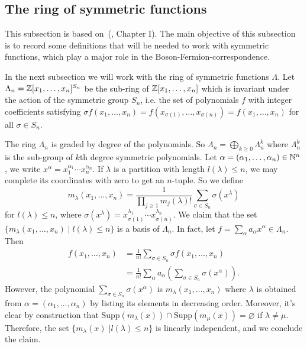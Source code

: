\subsection{The ring of symmetric functions}
This subsection is based on~(\cite{macdonald1998symmetric}, Chapter I). The main objective of this subsection is to record some definitions that will be needed to work with symmetric functions, which play a major role in the Boson-Fermion-correspondence.\par
In the next subsection we will work with the ring of symmetric functions $\Lambda$.
Let $\Lambda_n=\mathbb{Z}[x_1,\dots, x_n]^{S_n}$ be the sub-ring of $\mathbb{Z}[x_1,\dots,x_n]$ which is invariant under the action of the symmetric group $S_n$, i.e. the set of polynomials $f$ with integer coefficients satisfying $\sigma f(x_1,\dots,x_n)=f(x_{\sigma(1)},\dots, x_{\sigma(n)})=f(x_1,\dots,x_n)$ for all $\sigma\in S_n$. \par
The ring $\Lambda_n$ is graded by degree of the polynomials. So $\Lambda_n=\bigoplus_{k\geq0}\Lambda_n^k$ 
where $\Lambda_n^k$ is the sub-group of $k$th degree symmetric polynomials. 
Let $\alpha=(\alpha_1,\dots,\alpha_n)\in\mathbb{N}^n$, 
we write $x^\alpha=x_1^{\alpha_1}\cdots x_n^{\alpha_n}$. If $\lambda$ is a partition with length $l(\lambda)\leq n$, 
we may complete its coordinates with zero to get an $n$-tuple. So we define
\begin{equation}
    m_\lambda(x_1,\dots,x_n)=\frac{1}{\prod_{j\geq1} m_j(\lambda)!}\sum_{\sigma\in S_n}\sigma(x^\lambda)
\end{equation}
for $l(\lambda)\leq n$, where $\sigma(x^\lambda)=x_{\sigma(1)}^{\lambda_1}\cdots x_{\sigma(n)}^{\lambda_n}$. We claim that the set $\{m_\lambda(x_1,\dots,x_n)\;|\;l(\lambda)\leq n\}$ is a basis of $\Lambda_n$. In fact, let $f=\sum_{\alpha}a_{\alpha}x^{\alpha}\in\Lambda_n$. Then
\begin{equation}
\begin{split}
     f(x_1,\dots,x_n)&=\frac{1}{n!}\sum_{\sigma\in S_n}\sigma f(x_1,\dots,x_n)\\
     &=\frac{1}{n!}\sum_{\alpha}a_\alpha\left(\sum_{\sigma\in S_n}\sigma(x^\alpha)\right).
\end{split}
\end{equation}
However, the polynomial $\sum_{\sigma\in S_n}\sigma(x^\alpha)$ is $m_\lambda(x_1,\dots,x_n)$ where $\lambda$ is obtained from $\alpha=(\alpha_1,\dots,\alpha_n)$ by listing its elements in decreasing order. Moreover, it's clear by construction that $\text{Supp}(m_\lambda(x))\cap\text{Supp}(m_\mu(x))=\varnothing$ if $\lambda\neq\mu$. Therefore, the set $\{m_\lambda(x)\;|l(\lambda)\leq n\}$ is linearly independent, and we conclude the claim.\par
